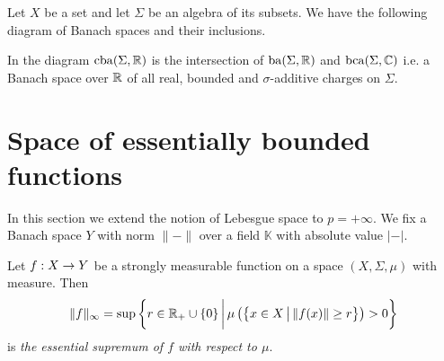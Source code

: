 \begin{remark}\label{remark:spaces_of_bounded_charges}
    Let $X$ be a set and let $\Sigma$ be an algebra of its subsets. We have the following diagram of Banach spaces and their inclusions.
    \begin{center}
    \end{center}
    In the diagram $\mathrm{cba}(\Sigma, {\mathbb R})$ is the intersection of $\mathrm{ba}(\Sigma,{\mathbb R})$ and $\mathrm{bca}(\Sigma,{\mathbb C})$ i.e. a Banach space over ${\mathbb R}$ of all real, bounded and $\sigma$-additive charges on $\Sigma$.
\end{remark}

\section{Space of essentially bounded functions}
\noindent
In this section we extend the notion of Lebesgue space to $p = +\infty$. We fix a Banach space $Y$ with norm $\lVert-\rVert$ over a field $\mathbb{K}$ with absolute value $|-|$.

\begin{definition}
    Let $f:X\rightarrow Y$ be a strongly measurable function on a space $(X,\Sigma,\mu)$ with measure. Then
    $$\lVert f \rVert_{\infty} = \sup \bigg\{r\in {\mathbb R}_+\cup \{0\}\,\bigg|\,\mu\left(\big\{x\in X\,\big|\,\lVert f(x)\rVert \geq r\big\}\right) > 0\bigg\}$$
    is \textit{the essential supremum of $f$ with respect to $\mu$}.
\end{definition}


